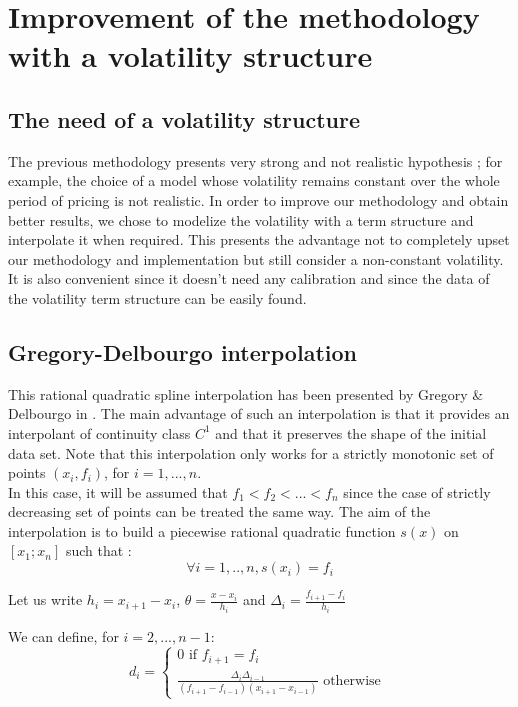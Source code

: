 \documentclass[a4paper,11pt,english]{book}
\begin{document}
\section{Improvement of the methodology with a volatility structure}
\subsection{The need of a volatility structure}
The previous methodology presents very strong and not realistic hypothesis ; for example, the choice of a model whose volatility remains constant over the whole period of pricing is not realistic. In order to improve our methodology and obtain better results, we chose to modelize the volatility with a term structure and interpolate it when required. This presents the advantage not to completely upset our methodology and implementation but still consider a non-constant volatility. It is also convenient since it doesn't need any calibration and since the data of the volatility term structure can be easily found.

\subsection{Gregory-Delbourgo interpolation}
This rational quadratic spline interpolation has been presented by Gregory \& Delbourgo in \cite{gregory1982piecewise}. The main advantage of such an interpolation is that it provides an interpolant of continuity class $C^1$ and that it preserves the shape of the initial data set. Note that this interpolation only works for a strictly monotonic set of points $(x_i,f_i)$, for $i=1,...,n$. \\

In this case, it will be assumed that $f_1 < f_2 < ...< f_n$ since the case of strictly decreasing set of points can be treated the same way. The aim of the interpolation is to build a piecewise rational quadratic function $s(x)$ on $[x_1;x_n]$ such that :
$$\forall i=1,..,n, s(x_i)=f_i$$

Let us write $h_i=x_{i+1}-x_i$, $\theta=\frac{x-x_i}{h_i}$ and $\Delta_i=\frac{f_{i+1}-f_i}{h_i}$

We can define, for $i=2,...,n-1$: $$d_i = \left\{
    \begin{array}{ll}
        0 \text{ if } f_{i+1}=f_i \\
        \frac{\Delta_i\Delta_{i-1}}{(f_{i+1}-f_{i-1})(x_{i+1}-x_{i-1})} \text{ otherwise }
    \end{array}
\right.$$
\end{document}
